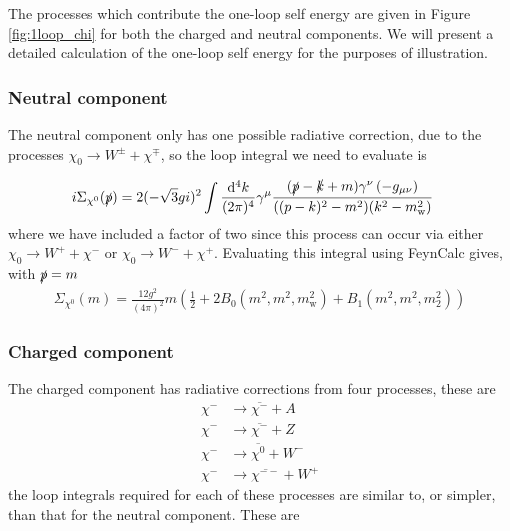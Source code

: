 \documentclass[11pt]{article}
\def\sp{\slashed{p}}
\def\cn{\chi^0}
\renewcommand{\d}{\ensuremath{\operatorname{d}\!}}
\begin{document}
The processes which contribute the one-loop self energy are given in Figure \ref{fig:1loop_chi} for both the charged and neutral components.  We will present a detailed calculation of the one-loop self energy for the purposes of illustration.


\subsubsection{Neutral component}

The neutral component only has one possible radiative correction, due to the processes $\chi_0\rightarrow W^{\pm} + \chi^{\mp}$, so the loop integral we need to evaluate is

\begin{align}
i\Sigma_{\cn}(\slashed{p})&= 2 (-\sqrt{3}gi)^2 \int \frac{\d^4k}{(2\pi)^4} \gamma^{\mu}\frac{(\slashed{p}-\slashed{k}+m)\gamma^{\nu}\left(-g_{\mu\nu}\right)}{((p-k)^2-m^2)(k^2-m_{\text{w}}^2)}\label{eqn:cn_loop}
\end{align}
where we have included a factor of two since this process can occur via either $\chi_0\rightarrow W^+ + \chi^-$ or $\chi_0\rightarrow W^- + \chi^+$.  Evaluating this integral using FeynCalc gives, with $\sp=m$
\begin{align}
\Sigma_{\cn}(m)= \frac{12g^2}{(4\pi)^2} m \left(\frac{1}{2}+2B_0(m^2,m^2,m_{\text{w}}^2)+B_1(m^2,m^2,m_2^2)\right)
\end{align}



\subsubsection{Charged component}

The charged component has radiative corrections from four processes, these are
\begin{align*}
\chi^{-}&\rightarrow \overline{\chi^{-}}+A\\
\chi^{-}&\rightarrow \overline{\chi^{-}}+Z\\
\chi^{-}&\rightarrow \overline{\chi^{0}}+W^-\\
\chi^{-}&\rightarrow \overline{\chi^{--}}+W^+
\end{align*}
the loop integrals required for each of these processes are similar to, or simpler, than that for the neutral component.  These are
\end{document}
